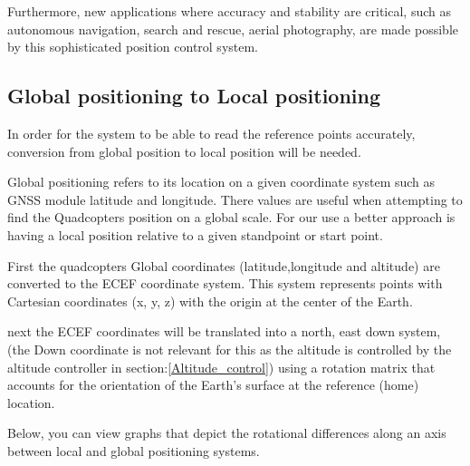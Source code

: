 \documentclass{report}
\begin{document}
Furthermore, new applications where accuracy and stability are critical, such as
autonomous navigation, search and rescue, aerial photography, are made possible
by this sophisticated position control system.

\subsection{Global positioning to Local positioning}\label{gp_vs_lp}
In order for the system to be able to read the reference points accurately, conversion from global position to local position will be needed.

Global positioning refers to its location on a given coordinate system such as GNSS module latitude and longitude. There values are useful when attempting to find the Quadcopters position on a global scale. For our use a better approach is having a local position relative to a given standpoint or start point.

First the quadcopters Global coordinates (latitude,longitude and altitude) are converted to the ECEF coordinate system. This system represents points with Cartesian coordinates (x, y, z) with the origin at the center of the Earth.

next the ECEF coordinates will be translated into a north, east down system, (the Down coordinate is not relevant for this as the altitude is controlled by the altitude controller in section:\ref{Altitude_control}) using a rotation matrix that accounts for the orientation of the Earth's surface at the reference (home) location. 

Below, you can view graphs that depict the rotational differences along an axis between local and global positioning systems.
\end{document}
